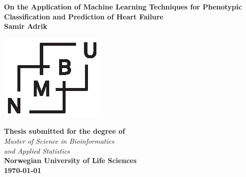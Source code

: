 \documentclass[../thesis.tex]{subfiles}
\begin{document}
\begin{titlepage}
\begin{center}
\vspace*{0,25cm}\Large{\textbf{On the Application of Machine Learning Techniques for Phenotypic Classification and Prediction of Heart Failure}}\\[0,4cm]

\vspace*{1,5cm}\large{\textbf{Samir Adrik}}

\vspace*{3cm}\includegraphics[scale=1.5]{../images/NMBU.eps}

\vspace{1cm}\normalsize{\textbf{Thesis submitted for the degree of}\\[0,1cm] \textit{Master of Science in Bioinformatics\\ and Applied Statistics}}\\[0,5cm]

\normalsize{\textbf{Norwegian University of Life Sciences}}\\[0,5cm]

\normalsize{\textbf{\today}}
\end{center}
\end{titlepage}

\newpage{\pagestyle{empty}\cleardoublepage}
\end{document}
